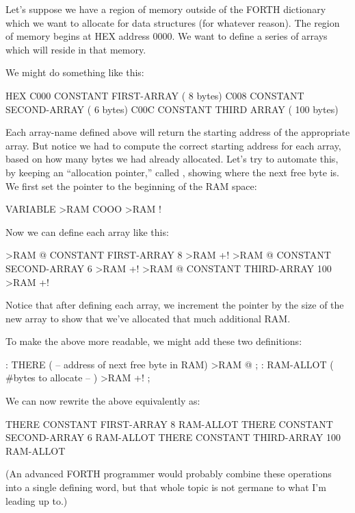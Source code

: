 Let's suppose we have a region of memory outside of the FORTH
dictionary which we want to allocate for data structures (for whatever
reason). The region of memory begins at HEX address 0000. We want to
define a series of arrays which will reside in that memory.

 We might do something like this:

\begin{Code}
HEX
C000 CONSTANT FIRST-ARRAY  ( 8 bytes)
C008 CONSTANT SECOND-ARRAY  ( 6 bytes)
C00C CONSTANT THIRD ARRAY  ( 100 bytes)
\end{Code}

Each array-name defined above will return the starting address of the
appropriate array. But notice we had to compute the correct starting
address for each array, based on how many bytes we had already
allocated. Let's try to automate this, by keeping an ``allocation
pointer,'' called , showing where the next free byte is. We first
set the pointer to the beginning of the RAM space:

\begin{Code}
VARIABLE >RAM
COOO >RAM !
\end{Code}

Now we can define each array like this:

\begin{Code}
>RAM @ CONSTANT FIRST-ARRAY    8 >RAM +!
>RAM @ CONSTANT SECOND-ARRAY   6 >RAM +!
>RAM @ CONSTANT THIRD-ARRAY  100 >RAM +!
\end{Code}

Notice that after defining each array, we increment the pointer by the
size of the new array to show that we've allocated that much additional
RAM.

To make the above more readable, we might add these two
definitions:

\begin{Code}
: THERE ( -- address of next free byte in RAM)
     >RAM @ ;
: RAM-ALLOT ( #bytes to allocate -- )  >RAM +! ;
\end{Code}

We can now rewrite the above equivalently as:

\begin{Code}
THERE CONSTANT FIRST-ARRAY    8 RAM-ALLOT
THERE CONSTANT SECOND-ARRAY   6 RAM-ALLOT
THERE CONSTANT THIRD-ARRAY  100 RAM-ALLOT
\end{Code}

(An advanced FORTH programmer would probably combine these operations
into a single defining word, but that whole topic is not germane to
what I'm leading up to.)

